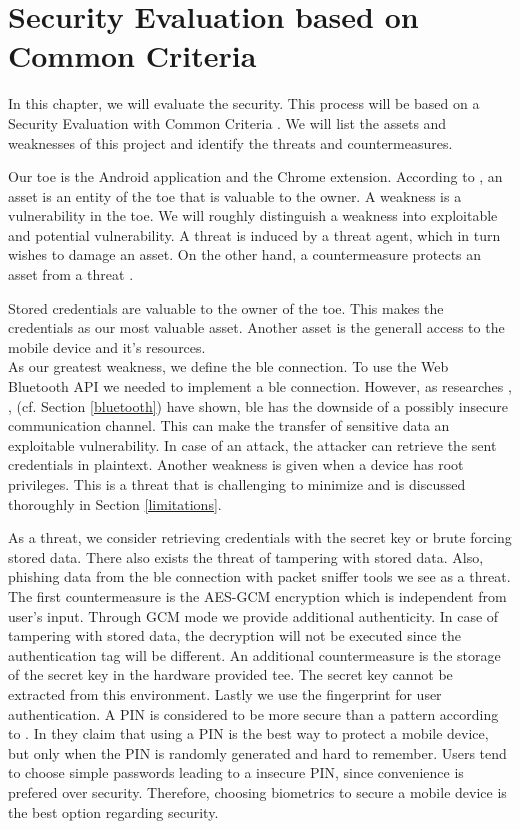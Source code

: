 \section{Security Evaluation based on Common Criteria} \label{seceval}
In this chapter, we will evaluate the security. This process will be based on a Security Evaluation with Common Criteria \cite{CC}. We will list the assets and weaknesses of this project and identify the threats and countermeasures.

Our \gls{toe} is the Android application and the Chrome extension. According to \cite{CC}, an asset is an entity of the \gls{toe} that is valuable to the owner. A weakness is a vulnerability in the \gls{toe}. We will roughly distinguish a weakness into exploitable and potential vulnerability.
A threat is induced by a threat agent, which in turn wishes to damage an asset. On the other hand, a countermeasure protects an asset from a threat \cite{CC}.

Stored credentials are valuable to the owner of the \gls{toe}. This makes the credentials as our most valuable asset. Another asset is the generall access to the mobile device and it's resources. \\
%
As our greatest weakness, we define the \gls{ble} connection. To use the Web Bluetooth API we needed to implement a \gls{ble} connection. However, as researches \cite{DBLP:conf/woot/Ryan13}, \cite{DBLP:journals/sensors/GomezOP12}, \cite{IntroductionBLE} (cf. Section \ref{bluetooth}) have shown, \gls{ble} has the downside of a possibly insecure communication channel. This can make the transfer of sensitive data an exploitable vulnerability. In case of an attack, the attacker can retrieve the sent credentials in plaintext. Another weakness is given when a device has root privileges. This is a threat that is challenging to minimize and is discussed thoroughly in Section \ref{limitations}.

As a threat, we consider retrieving credentials with the secret key or brute forcing stored data. There also exists the threat of tampering with stored data. Also, phishing data from the \gls{ble} connection with packet sniffer tools we see as a threat. \\
The first countermeasure is the AES-GCM encryption which is independent from user's input. Through GCM mode we provide additional authenticity. In case of tampering with stored data, the decryption will not be executed since the authentication tag will be different. An additional countermeasure is the storage of the secret key in the hardware provided \gls{tee}. The secret key cannot be extracted from this environment. Lastly we use the fingerprint for user authentication. A PIN is considered to be more secure than a pattern according to \cite{PinSaferThanPattern}. In \cite{SecureWayToLockPhone} they claim that using a PIN is the best way to protect a mobile device, but only when the PIN is randomly generated and hard to remember. Users tend to choose simple passwords leading to a insecure PIN, since convenience is prefered over security. Therefore, choosing biometrics to secure a mobile device is the best option regarding security.


